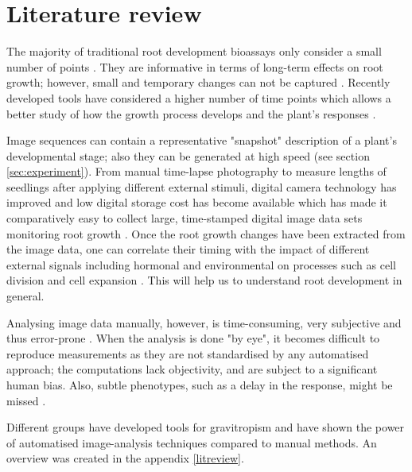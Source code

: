 \section{Literature review}

The majority of traditional root development bioassays only consider a small number of points \cite{parry2001novel,french2009high}. They are informative in terms of long-term effects on root growth; however, small and temporary changes can not be captured \cite{parry2001novel}.
Recently developed tools have considered a higher number of time points which allows a better study of how the growth process develops and the plant's responses \cite{french2009high,ishikawa1997novel,van2003new,chavarria2008spatio,miller2007computer}.

Image sequences can contain a representative "snapshot" description of a plant's developmental stage; also they can be generated at high speed (see section \ref{sec:experiment}). From manual time-lapse photography \cite{van1934einfluss,michener1938action} to measure lengths of seedlings after applying different external stimuli, digital camera  technology has improved and low digital storage cost has become available which has made it comparatively easy to collect large, time-stamped digital image data sets monitoring root growth \cite{french2009high}.
Once the root growth changes have been extracted from the image data, one can correlate their timing with the impact of different external signals including hormonal and environmental on processes such as cell division and cell expansion \cite{french2009high}. This will help us to understand root development in general. 

Analysing image data manually, however, is time-consuming, very subjective and thus error-prone \cite{french2009high}. When the analysis is done "by eye", it becomes difficult to reproduce measurements as they are not standardised by any automatised approach; the computations lack objectivity, and are subject to a significant human bias. Also, subtle phenotypes, such as a delay in the response, might be missed \cite{french2009high}. 

Different groups have developed tools for gravitropism and have shown the power of automatised image-analysis techniques compared to manual methods. An overview was created in the appendix \ref{litreview}.



